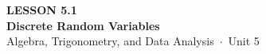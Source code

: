 \documentclass[aspectratio=169, 11pt]{beamer}
\begin{document}
{
\begin{frame}[plain]
  \vspace{2.8cm}\hspace{0.55cm}%
  \begin{minipage}{0.9\textwidth}
    {\color{goldacc}\bfseries\small LESSON 5.1}\\[0.5cm]
    {\color{white}\bfseries\LARGE Discrete Random Variables}\\[1.2cm]
    {\color{mistmid}\small Algebra, Trigonometry, and Data Analysis~$\cdot$~Unit 5}
  \end{minipage}
\end{frame}
}

\begin{frame}[t, plain]
\end{frame}
\end{document}
